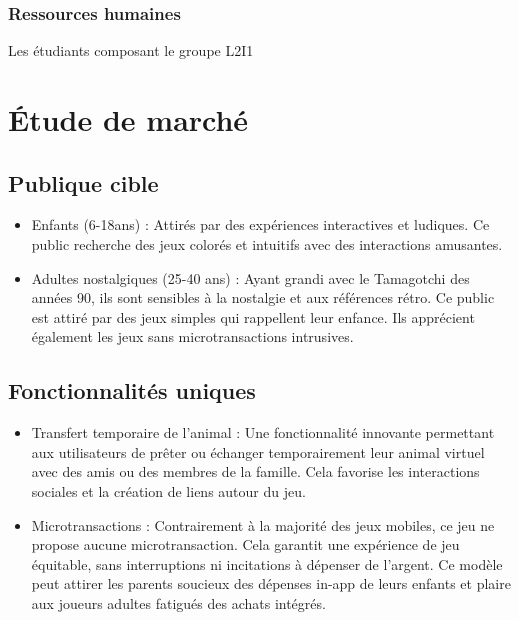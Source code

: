 \documentclass{cahier_des_charges}
\begin{document}
\subsubsection{Ressources humaines}
Les étudiants composant le groupe L2I1

\section{Étude de marché}
\subsection{Publique cible}
\begin{itemize}[label=\textbullet]
\item Enfants (6-18ans) :
Attirés par des expériences interactives et ludiques. Ce public recherche des jeux colorés et
intuitifs avec des interactions amusantes.
\item Adultes nostalgiques (25-40 ans) :
Ayant grandi avec le Tamagotchi des années 90, ils sont sensibles à la nostalgie et aux références
rétro. Ce public est attiré par des jeux simples qui rappellent leur enfance. Ils apprécient
également les jeux sans microtransactions intrusives.
\end{itemize}
\subsection{Fonctionnalités uniques}
\begin{itemize}[label=\textbullet]
\item Transfert temporaire de l’animal :
Une fonctionnalité innovante permettant aux utilisateurs de prêter ou échanger temporairement
leur animal virtuel avec des amis ou des membres de la famille. Cela favorise les interactions
sociales et la création de liens autour du jeu.
\item Microtransactions :
Contrairement à la majorité des jeux mobiles, ce jeu ne propose aucune microtransaction. Cela
garantit une expérience de jeu équitable, sans interruptions ni incitations à dépenser de l’argent.
Ce modèle peut attirer les parents soucieux des dépenses in-app de leurs enfants et plaire aux
joueurs adultes fatigués des achats intégrés.
\end{itemize}
\end{document}

